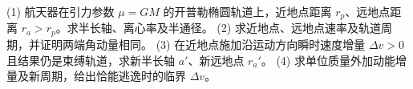 (1) 航天器在引力参数 \(\mu=GM\) 的开普勒椭圆轨道上，近地点距离 \(r_p\)、远地点距离 \(r_a>r_p\)。求半长轴、离心率及半通径。
(2) 求近地点、远地点速率及轨道周期，并证明两端角动量相同。
(3) 在近地点施加沿运动方向瞬时速度增量 \(\Delta v>0\) 且结果仍是束缚轨道，求新半长轴 \(a'\)、新远地点 \(r_a'\)。
(4) 求单位质量外加动能增量及新周期，给出恰能逃逸时的临界 \(\Delta v\)。
